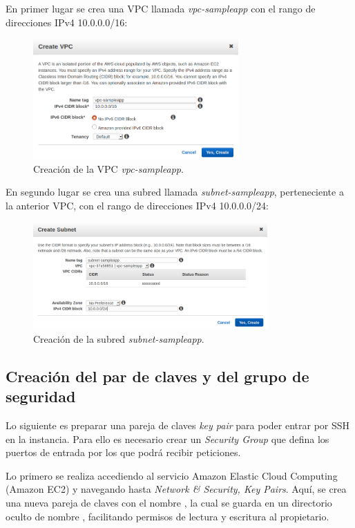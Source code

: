 En primer lugar se crea una VPC llamada \textit{vpc-sampleapp} con el rango de direcciones IPv4 10.0.0.0/16:

\begin{figure}[H]
\centering
\includegraphics[width=0.7\textwidth]{images/figures/vpc-sampleapp.png}
\caption{Creación de la VPC \textit{vpc-sampleapp}.}
\end{figure}

En segundo lugar se crea una subred llamada \textit{subnet-sampleapp}, perteneciente a la anterior VPC, con el rango de direcciones IPv4 10.0.0.0/24:

\begin{figure}[H]
\centering
\includegraphics[width=0.8\textwidth]{images/figures/subnet-sampleapp.png}
\caption{Creación de la subred \textit{subnet-sampleapp}.}
\end{figure}

\subsection{Creación del par de claves y del grupo de seguridad}

Lo siguiente es preparar una pareja de claves \textit{key pair} para poder entrar por SSH en la instancia. Para ello es necesario crear un \textit{Security Group} que defina los puertos de entrada por los que podrá recibir peticiones.

Lo primero se realiza accediendo al servicio Amazon Elastic Cloud Computing (Amazon EC2) y navegando hasta \textit{Network \& Security, Key Pairs}. Aquí, se crea una nueva pareja de claves con el nombre , la cual se guarda en un directorio oculto de nombre , facilitando permisos de lectura y escritura al propietario.

